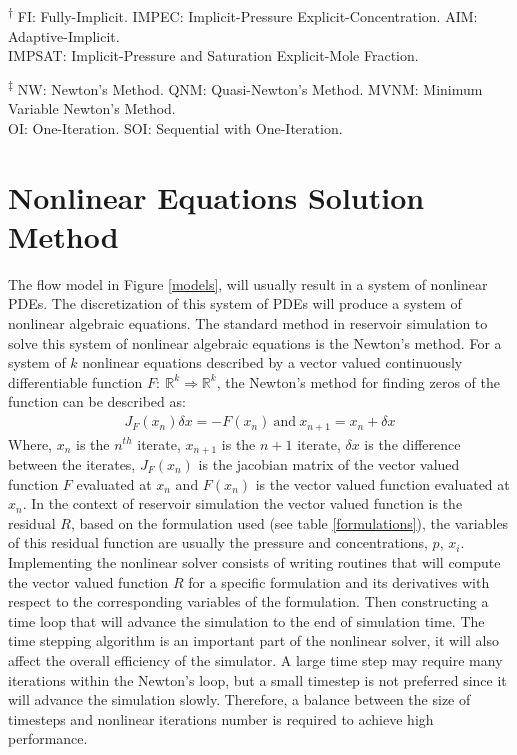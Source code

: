 \begin{table}[h]
\begin{threeparttable}
	\begin{tablenotes}
	\small
	\item [\textsuperscript{$\dag$}] FI: Fully-Implicit. IMPEC: Implicit-Pressure Explicit-Concentration. AIM: Adaptive-Implicit.\\
		\phantom{x}\hspace{0.1cm}IMPSAT: Implicit-Pressure and Saturation Explicit-Mole Fraction.
	\item [\textsuperscript{$\ddag$}] NW: Newton's Method. QNM: Quasi-Newton's Method. MVNM: Minimum Variable Newton's Method.\\
		\phantom{x}\hspace{0.1cm} OI: One-Iteration. SOI: Sequential with One-Iteration.
	\end{tablenotes}
	\end{threeparttable}
\end{table}%

\section{Nonlinear Equations Solution Method}
The flow model in Figure \ref{models}, will usually result in a system of nonlinear PDEs. The discretization of this system of PDEs will
produce a system of nonlinear algebraic equations. The standard method in reservoir simulation to solve this system of nonlinear
algebraic equations is the Newton's method. For a system of $k$ nonlinear equations described by a vector valued continuously differentiable 
function $F: \ \mathbb{R}^{k}\Rightarrow\mathbb{R}^{k}$, the Newton's method for finding zeros of the function can be described as:
\begin{align}
	J_{F}(x_{n})\delta x = -F(x_{n}) \ \text{and} \ x_{n+1} = x_{n} +\delta x
\end{align}
Where, $x_{n}$ is the $n^{th}$ iterate, $x_{n+1}$ is the $n+1$ iterate, $\delta x$ is the difference between the iterates, $J_{F}(x_{n})$ is the
jacobian matrix of the vector valued function $F$ evaluated at $x_{n}$ and $F(x_{n})$ is the vector valued function evaluated at $x_{n}$.
In the context of reservoir simulation the vector valued function is the residual $R$, based on the formulation used (see table \ref{formulations}), the variables 
of this residual function are usually the pressure and concentrations, $p$, $x_{i}$. Implementing the nonlinear solver consists of writing routines that will compute
the vector valued function $R$ for a specific formulation and its derivatives with respect to the corresponding variables of the formulation. Then constructing a time loop
that will advance the simulation to the end of simulation time. The time stepping algorithm is an important part of the nonlinear solver, it will also affect the
overall efficiency of the simulator. A large time step may require many iterations within the Newton's loop, but a small timestep is not preferred since it will advance
the simulation slowly. Therefore, a balance between the size of timesteps and nonlinear iterations number is required to achieve high performance. 

